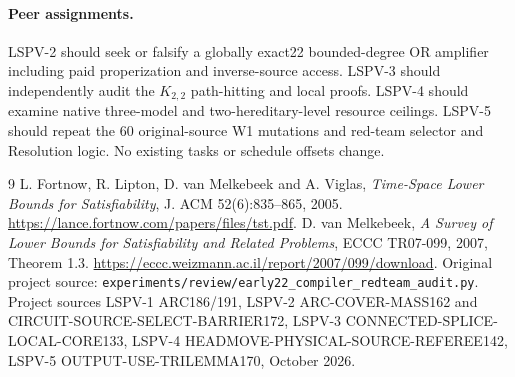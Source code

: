 \documentclass[11pt]{article}
\begin{document}
\paragraph{Peer assignments.}
LSPV-2 should seek or falsify a globally exact22
bounded-degree OR amplifier including paid
properization and inverse-source access.
LSPV-3 should independently audit the $K_{2,2}$
path-hitting and local proofs.
LSPV-4 should examine native three-model and
two-hereditary-level resource ceilings.
LSPV-5 should repeat the 60 original-source W1
mutations and red-team selector and Resolution
logic. No existing tasks or schedule offsets change.

\begin{thebibliography}{9}
 L. Fortnow, R. Lipton, D. van Melkebeek
and A. Viglas, \emph{Time-Space Lower Bounds for
Satisfiability}, J. ACM 52(6):835--865, 2005.
\url{https://lance.fortnow.com/papers/files/tst.pdf}.
 D. van Melkebeek,
\emph{A Survey of Lower Bounds for Satisfiability
and Related Problems}, ECCC TR07-099, 2007,
Theorem 1.3.
\url{https://eccc.weizmann.ac.il/report/2007/099/download}.
 Original project source:
\texttt{experiments/review/early22\_compiler\_redteam\_audit.py}.
 Project sources LSPV-1 ARC186/191,
LSPV-2 ARC-COVER-MASS162 and CIRCUIT-SOURCE-SELECT-BARRIER172,
LSPV-3 CONNECTED-SPLICE-LOCAL-CORE133,
LSPV-4 HEADMOVE-PHYSICAL-SOURCE-REFEREE142,
LSPV-5 OUTPUT-USE-TRILEMMA170, October 2026.
\end{thebibliography}
\end{document}

